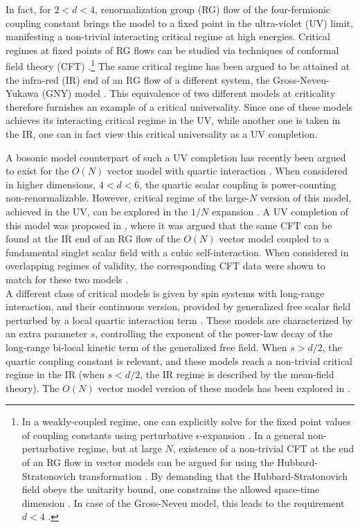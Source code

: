 \documentclass[aps,amsmath,amssymb,prd,showpacs,floatfix,preprint,superscriptaddress,nofootinbib,12pt]{article}
\begin{document}
In fact, for $2<d<4$, renormalization group (RG) flow of the four-fermionic coupling constant brings the model
to a fixed point in the ultra-violet (UV) limit, manifesting a non-trivial interacting critical regime at high energies.
Critical regimes at fixed points of RG flows can be studied via
techniques of conformal field theory (CFT) \cite{Polyakov:1970xd}.\footnote{In a weakly-coupled regime,
one can explicitly solve for the fixed point values of coupling constants using
perturbative $\epsilon$-expansion \cite{Wilson:1971dc}. In a general non-perturbative regime, but at large $N$,
existence of a non-trivial CFT
at the end of an RG flow in vector models can be  argued for using the Hubbard-Stratonovich
transformation \cite{Gubser:2002vv}. By demanding that the Hubbard-Stratonovich field
obeys the unitarity bound, one 
constrains the allowed space-time dimension \cite{Parisi:1975im}.
In case of the Gross-Neveu model, this leads to the requirement $d<4$ \cite{Gross:1974jv,Zinn-Justin:1991ksq}.}
The same critical regime has been argued
to be attained at the infra-red (IR) end of an RG flow of a different system, the
Gross-Neveu-Yukawa (GNY) model  \cite{Zinn-Justin:1991ksq}. This equivalence of two
different models at criticality therefore furnishes an example of a critical universality.
Since one of these models achieves its interacting critical regime in the UV, while another one is taken
in the IR, one can in fact view this critical universality as a UV completion.

A bosonic model counterpart of such a UV completion has recently been argued
to exist for the $O(N)$ vector model with quartic interaction \cite{Fei:2014yja}. When considered in
higher dimensions, $4<d<6$, the quartic scalar coupling is power-counting non-renormalizable.
However, critical regime of the large-$N$ version of this model, achieved in the UV, can be explored in the $1/N$
expansion \cite{Parisi:1975im}. A UV completion of this model was proposed in \cite{Fei:2014yja}, where it was
argued that the same CFT can be found at the IR end of an RG flow of the 
$O(N)$ vector model coupled to a fundamental singlet scalar field with a cubic self-interaction.
When considered in overlapping regimes
of validity, the corresponding CFT data were shown to match for these two models \cite{Fei:2014yja,Fei:2014xta,Gracey:2015tta}.\\

A different class of critical models is given by spin systems with long-range interaction,
and their continuous version, provided by generalized free scalar field perturbed by a local quartic interaction
term \cite{Dyson:1968up,Fisher:1972zz,Kosterlitz:1976,Aizenman1988}. These models
are characterized by an extra parameter $s$, controlling the exponent of the power-law
decay of the long-range bi-local kinetic term of the generalized free field.
When $s>d/2$, the quartic coupling constant is relevant, and
 these models reach a non-trivial critical regime in the IR (when $s<d/2$,
the IR regime is described by the mean-field theory).
The $O(N)$ vector model version of
these models has been explored in \cite{Gubser:2017vgc,Giombi:2019enr,Chai:2021arp}.
\end{document}
